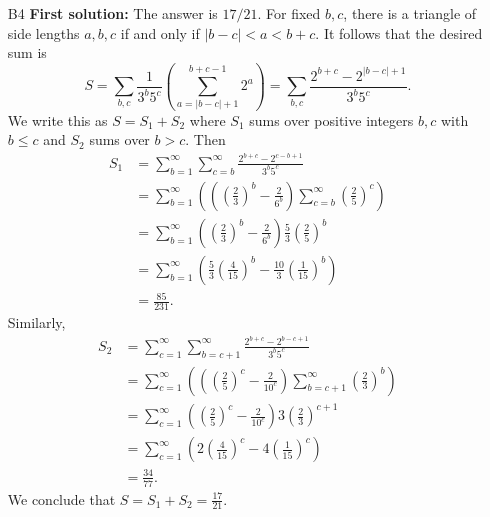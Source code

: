\documentclass[amssymb,twocolumn,pra,10pt,aps]{revtex4-1}
\begin{document}
\begin{itemize}
\item[B4]
\textbf{First solution:}
The answer is $17/21$. For fixed $b,c$, there is a triangle of side lengths $a,b,c$ if and only if $|b-c|<a<b+c$. It follows that the desired sum is
\[
S = \sum_{b,c} \frac{1}{3^b5^c} \left(\sum_{a=|b-c|+1}^{b+c-1} 2^a \right) = \sum_{b,c} \frac{2^{b+c}-2^{|b-c|+1}}{3^b5^c}.
\]
We write this as $S = S_1+S_2$ where $S_1$ sums over positive integers $b,c$ with $b\leq c$ and $S_2$ sums over $b>c$. Then
\begin{align*}
S_1 &= \sum_{b=1}^\infty \sum_{c=b}^\infty \frac{2^{b+c}-2^{c-b+1}}{3^b 5^c} \\
&= \sum_{b=1}^\infty \left( \left( \left(\frac{2}{3}\right)^b-\frac{2}{6^b} \right) \sum_{c=b}^\infty \left(\frac{2}{5} \right)^c \right) \\
&= \sum_{b=1}^\infty \left( \left(\frac{2}{3}\right)^b-\frac{2}{6^b} \right) \frac{5}{3} \left( \frac{2}{5} \right)^b \\
&= \sum_{b=1}^\infty \left( \frac{5}{3} \left(\frac{4}{15}\right)^b - \frac{10}{3} \left(\frac{1}{15}\right)^b \right) \\
&= \frac{85}{231}.
\end{align*}
Similarly,
\begin{align*}
S_2 &= \sum_{c=1}^\infty \sum_{b=c+1}^\infty \frac{2^{b+c}-2^{b-c+1}}{3^b 5^c} \\
&= \sum_{c=1}^\infty \left( \left( \left(\frac{2}{5}\right)^c-\frac{2}{10^c} \right) \sum_{b=c+1}^\infty \left(\frac{2}{3} \right)^b \right) \\
&= \sum_{c=1}^\infty \left( \left(\frac{2}{5}\right)^c-\frac{2}{10^c} \right) 3 \left( \frac{2}{3} \right)^{c+1} \\
&= \sum_{c=1}^\infty \left( 2 \left(\frac{4}{15}\right)^c - 4 \left(\frac{1}{15}\right)^c \right) \\
&= \frac{34}{77}.
\end{align*}
We conclude that $S = S_1+S_2 = \frac{17}{21}$.


\end{itemize}
\end{document}
